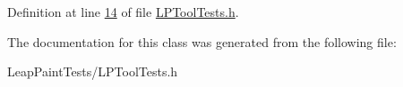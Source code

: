 Definition at line \hyperlink{_l_p_tool_tests_8h_source_l00014}{14} of file \hyperlink{_l_p_tool_tests_8h_source}{L\-P\-Tool\-Tests.\-h}.



The documentation for this class was generated from the following file\-:\begin{DoxyCompactItemize}
\item 
Leap\-Paint\-Tests/L\-P\-Tool\-Tests.\-h\end{DoxyCompactItemize}
